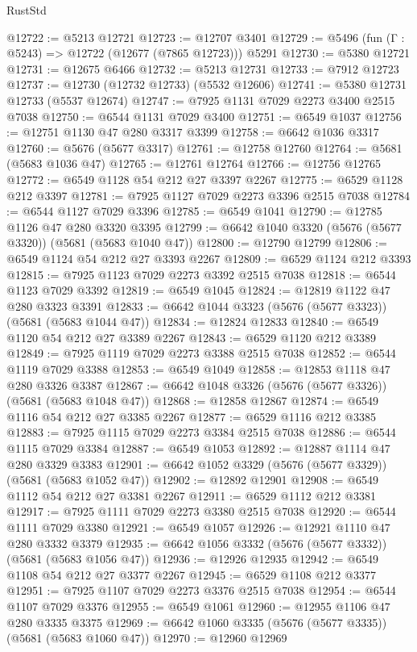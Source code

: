 \begin{lexlean}{RustStd}
\begin{coremodule}
@12722 := @5213 @12721
@12723 := @12707 @3401
@12729 := @5496 (fun (Γ : @5243) => @12722 (@12677 (@7865 @12723))) @5291
@12730 := @5380 @12721
@12731 := @12675 @6466
@12732 := @5213 @12731
@12733 := @7912 @12723
@12737 := @12730 (@12732 @12733) (@5532 @12606)
@12741 := @5380 @12731 @12733 (@5537 @12674)
@12747 := @7925 @1131 @7029 @2273 @3400 @2515 @7038
@12750 := @6544 @1131 @7029 @3400
@12751 := @6549 @1037
@12756 := @12751 @1130 @47 @280 @3317 @3399
@12758 := @6642 @1036 @3317
@12760 := @5676 (@5677 @3317)
@12761 := @12758 @12760
@12764 := @5681 (@5683 @1036 @47)
@12765 := @12761 @12764
@12766 := @12756 @12765
@12772 := @6549 @1128 @54 @212 @27 @3397 @2267
@12775 := @6529 @1128 @212 @3397
@12781 := @7925 @1127 @7029 @2273 @3396 @2515 @7038
@12784 := @6544 @1127 @7029 @3396
@12785 := @6549 @1041
@12790 := @12785 @1126 @47 @280 @3320 @3395
@12799 := @6642 @1040 @3320 (@5676 (@5677 @3320)) (@5681 (@5683 @1040 @47))
@12800 := @12790 @12799
@12806 := @6549 @1124 @54 @212 @27 @3393 @2267
@12809 := @6529 @1124 @212 @3393
@12815 := @7925 @1123 @7029 @2273 @3392 @2515 @7038
@12818 := @6544 @1123 @7029 @3392
@12819 := @6549 @1045
@12824 := @12819 @1122 @47 @280 @3323 @3391
@12833 := @6642 @1044 @3323 (@5676 (@5677 @3323)) (@5681 (@5683 @1044 @47))
@12834 := @12824 @12833
@12840 := @6549 @1120 @54 @212 @27 @3389 @2267
@12843 := @6529 @1120 @212 @3389
@12849 := @7925 @1119 @7029 @2273 @3388 @2515 @7038
@12852 := @6544 @1119 @7029 @3388
@12853 := @6549 @1049
@12858 := @12853 @1118 @47 @280 @3326 @3387
@12867 := @6642 @1048 @3326 (@5676 (@5677 @3326)) (@5681 (@5683 @1048 @47))
@12868 := @12858 @12867
@12874 := @6549 @1116 @54 @212 @27 @3385 @2267
@12877 := @6529 @1116 @212 @3385
@12883 := @7925 @1115 @7029 @2273 @3384 @2515 @7038
@12886 := @6544 @1115 @7029 @3384
@12887 := @6549 @1053
@12892 := @12887 @1114 @47 @280 @3329 @3383
@12901 := @6642 @1052 @3329 (@5676 (@5677 @3329)) (@5681 (@5683 @1052 @47))
@12902 := @12892 @12901
@12908 := @6549 @1112 @54 @212 @27 @3381 @2267
@12911 := @6529 @1112 @212 @3381
@12917 := @7925 @1111 @7029 @2273 @3380 @2515 @7038
@12920 := @6544 @1111 @7029 @3380
@12921 := @6549 @1057
@12926 := @12921 @1110 @47 @280 @3332 @3379
@12935 := @6642 @1056 @3332 (@5676 (@5677 @3332)) (@5681 (@5683 @1056 @47))
@12936 := @12926 @12935
@12942 := @6549 @1108 @54 @212 @27 @3377 @2267
@12945 := @6529 @1108 @212 @3377
@12951 := @7925 @1107 @7029 @2273 @3376 @2515 @7038
@12954 := @6544 @1107 @7029 @3376
@12955 := @6549 @1061
@12960 := @12955 @1106 @47 @280 @3335 @3375
@12969 := @6642 @1060 @3335 (@5676 (@5677 @3335)) (@5681 (@5683 @1060 @47))
@12970 := @12960 @12969

\end{coremodule}
\end{lexlean}
